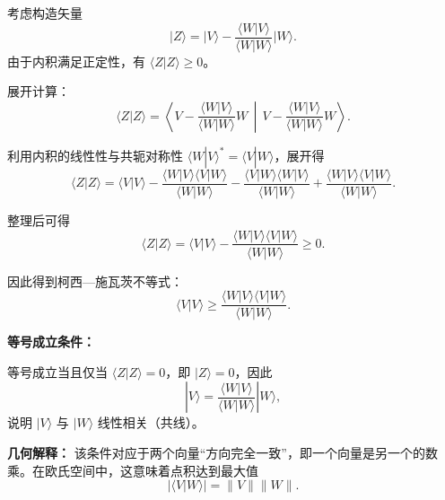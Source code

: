 \begin{solution}

\answer
考虑构造矢量
\[
|Z\rangle = |V\rangle - \frac{\langle W|V\rangle}{\langle W|W\rangle}|W\rangle.
\]
由于内积满足正定性，有 $\langle Z|Z\rangle \ge 0$。

展开计算：
\[
\langle Z|Z\rangle
=\left\langle V - \frac{\langle W|V\rangle}{\langle W|W\rangle}W \,\middle|\, V - \frac{\langle W|V\rangle}{\langle W|W\rangle}W \right\rangle.
\]

利用内积的线性性与共轭对称性 $\langle W|V\rangle^*=\langle V|W\rangle$，展开得
\[
\langle Z|Z\rangle
=\langle V|V\rangle
-\frac{\langle W|V\rangle \langle V|W\rangle}{\langle W|W\rangle}
-\frac{\langle V|W\rangle \langle W|V\rangle}{\langle W|W\rangle}
+\frac{\langle W|V\rangle \langle V|W\rangle}{\langle W|W\rangle}.
\]

整理后可得
\[
\langle Z|Z\rangle
=\langle V|V\rangle - \frac{\langle W|V\rangle \langle V|W\rangle}{\langle W|W\rangle} \ge 0.
\]

因此得到柯西—施瓦茨不等式：
\[
\langle V|V\rangle \ge \frac{\langle W|V\rangle \langle V|W\rangle}{\langle W|W\rangle}.
\]

\textbf{等号成立条件：}

等号成立当且仅当 $\langle Z|Z\rangle=0$，即 $|Z\rangle=0$，因此
\[
|V\rangle = \frac{\langle W|V\rangle}{\langle W|W\rangle}|W\rangle,
\]
说明 $|V\rangle$ 与 $|W\rangle$ 线性相关（共线）。

\textbf{几何解释：}
该条件对应于两个向量“方向完全一致”，即一个向量是另一个的数乘。在欧氏空间中，这意味着点积达到最大值
\[
|\langle V|W\rangle| = \|V\|\|W\|.
\]

\end{solution}

